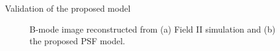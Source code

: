 {\begin{block}{Validation of the proposed model}
\begin{figure}
		\hfill%
		\caption{B-mode image reconstructed from (a) Field II simulation and (b) the proposed PSF model.}
	\end{figure}
\end{block}
}%